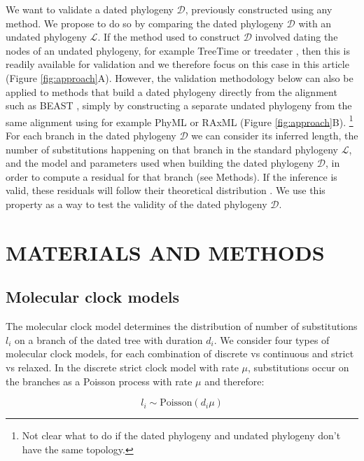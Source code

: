 \documentclass{article}
\begin{document}
We want to validate a dated phylogeny $\mathcal{D}$, previously constructed using
any method. We propose to do so by comparing the dated phylogeny $\mathcal{D}$ with 
an undated phylogeny $\mathcal{L}$. 
If the method used to construct $\mathcal{D}$ involved dating the nodes of an undated
phylogeny, for example TreeTime \citep{Sagulenko2018} or treedater \citep{Volz2017}, 
then this is readily available for validation and we therefore focus on this case in this article
(Figure \ref{fig:approach}A). However, the validation methodology
below can also be applied to methods that build a dated phylogeny directly from the alignment
such as BEAST \citep{Suchard2018},
simply by constructing a separate undated phylogeny from the same alignment using
for example PhyML \citep{Guindon2010} or RAxML \citep{Stamatakis2015} 
(Figure \ref{fig:approach}B). 
\footnote{Not clear what to do if the dated phylogeny and undated phylogeny don't have the same topology.}
For each branch in the dated phylogeny $\mathcal{D}$ we can
consider its inferred length, the number of substitutions happening on that branch in the standard phylogeny
$\mathcal{L}$, and the model and parameters used when building the dated phylogeny $\mathcal{D}$,
in order to compute a residual for that branch (see Methods). If the inference is valid,
these residuals will follow their theoretical distribution
\citep{coxGeneralDefinitionResiduals1968,dunnRandomizedQuantileResiduals1996}. 
We use this property as a way to test the validity of the dated phylogeny $\mathcal{D}$.

\section*{MATERIALS AND METHODS}

\subsection*{Molecular clock models}

The molecular clock model determines the distribution of number of substitutions $l_i$ on a branch of the dated
tree with duration $d_i$. We consider four types of molecular clock models, for each combination of discrete
vs continuous and strict vs relaxed. In the discrete strict clock
model \citep{Zuckerkandl1962} with rate $\mu$,
substitutions occur on the branches as a Poisson process with rate $\mu$ and therefore:

\begin{equation}
l_i \sim \mathrm{Poisson}(d_i \mu)
\label{eq:sc}
\end{equation}
\end{document}
